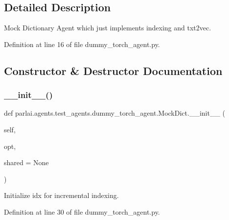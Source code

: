 \subsection{Detailed Description}
\begin{DoxyVerb}Mock Dictionary Agent which just implements indexing and txt2vec.\end{DoxyVerb}
 

Definition at line 16 of file dummy\+\_\+torch\+\_\+agent.\+py.



\subsection{Constructor \& Destructor Documentation}
\mbox{\label{classparlai_1_1agents_1_1test__agents_1_1dummy__torch__agent_1_1MockDict_ac1430e2d948a25733e5302222479a351}} 
\subsubsection{\texorpdfstring{\+\_\+\+\_\+init\+\_\+\+\_\+()}{\_\_init\_\_()}}
{\footnotesize\ttfamily def parlai.\+agents.\+test\+\_\+agents.\+dummy\+\_\+torch\+\_\+agent.\+Mock\+Dict.\+\_\+\+\_\+init\+\_\+\+\_\+ (\begin{DoxyParamCaption}\item[{}]{self,  }\item[{}]{opt,  }\item[{}]{shared = {\ttfamily None} }\end{DoxyParamCaption})}

\begin{DoxyVerb}Initialize idx for incremental indexing.\end{DoxyVerb}
 

Definition at line 30 of file dummy\+\_\+torch\+\_\+agent.\+py.



